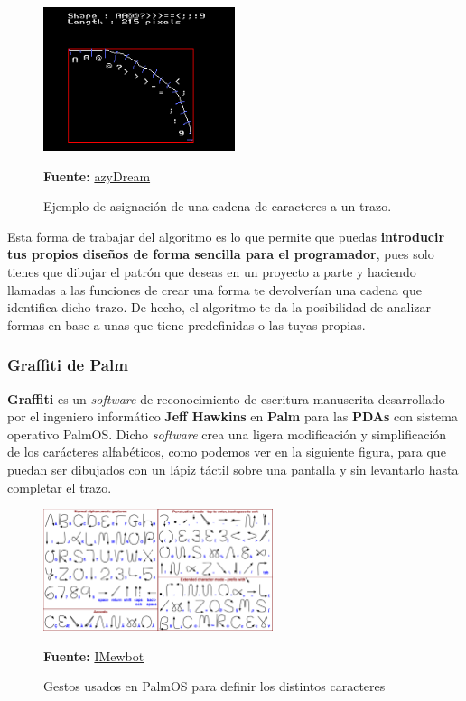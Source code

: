 \begin{figure}[htbp]
\centering
  \includegraphics[width=0.5\textwidth]{archivos/recoex.png}
  \caption{Ejemplo de asignación de una cadena de caracteres a un trazo.}
  \textbf{Fuente:} \href{https://azydream.tistory.com/55}{azyDream}
  \label{fig:recoex}
\end{figure}


\vspace{0.5cm}

Esta forma de trabajar del algoritmo es lo que permite que puedas \textbf{introducir tus propios diseños de forma sencilla para el programador}, pues solo tienes que dibujar el patrón que deseas en un proyecto a parte y haciendo llamadas a las funciones de crear una forma te devolverían una cadena que identifica dicho trazo. De hecho, el algoritmo te da la posibilidad de analizar formas en base a unas que tiene predefinidas o las tuyas propias.

\vspace{0.5cm}

\subsubsection{Graffiti de Palm}

\textbf{Graffiti} es un \textit{software} de reconocimiento de escritura manuscrita desarrollado por el ingeniero informático \textbf{Jeff Hawkins} en \textbf{Palm} para las \textbf{PDAs} con sistema operativo PalmOS. Dicho \textit{software} crea una ligera modificación y simplificación de los carácteres alfabéticos, como podemos ver en la siguiente figura, para que puedan ser dibujados con un lápiz táctil sobre una pantalla y sin levantarlo hasta completar el trazo.

\clearpage


\begin{figure}[htbp]
\centering
  \includegraphics[width=0.6\textwidth]{archivos/palm_gestures.png}
  \caption{Gestos usados en PalmOS para definir los distintos caracteres}
\textbf{Fuente:} \href{https://es.wikipedia.org/wiki/Graffiti_(Palm_OS)#/media/Archivo:Palm_Graffiti_gestures.png}{IMewbot}
  \label{fig:palm_gestures}
\end{figure}

